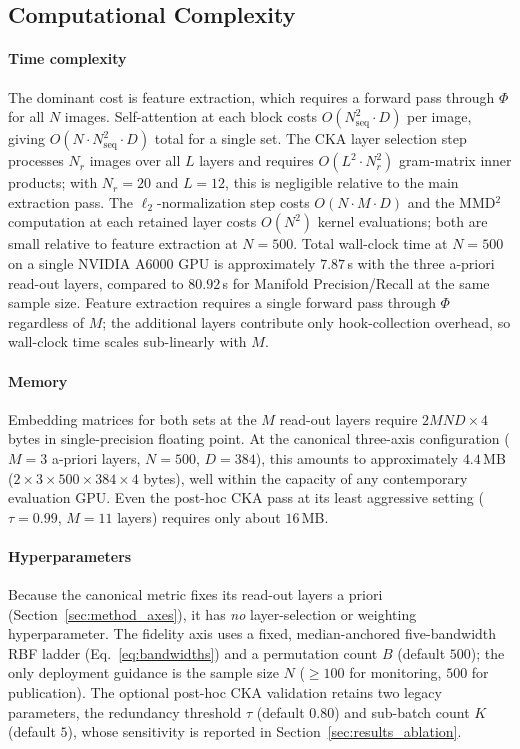 \documentclass[lettersize,journal]{IEEEtran}
\begin{document}
\subsection{Computational Complexity}
\label{sec:method_complexity}

\paragraph{Time complexity}
The dominant cost is feature extraction, which requires a forward pass
through $\Phi$ for all $N$ images.
Self-attention at each block costs $O(N_\text{seq}^2 \cdot D)$ per image,
giving $O(N \cdot N_\text{seq}^2 \cdot D)$ total for a single set.
The CKA layer selection step processes $N_r$ images over all $L$ layers
and requires $O(L^2 \cdot N_r^2)$ gram-matrix inner products; with
$N_r = 20$ and $L = 12$, this is negligible relative to the main
extraction pass.
The $\ell_2$-normalization step costs $O(N \cdot M \cdot D)$ and the
MMD$^2$ computation at each retained layer costs $O(N^2)$ kernel
evaluations; both are small relative to feature extraction at $N = 500$.
Total wall-clock time at $N = 500$ on a single NVIDIA A6000 GPU is
approximately $7.87$\,s with the three a-priori read-out layers, compared
to $80.92$\,s for Manifold Precision/Recall at the same sample size.
Feature extraction requires a single forward pass through $\Phi$
regardless of $M$; the additional layers contribute only hook-collection
overhead, so wall-clock time scales sub-linearly with $M$.

\paragraph{Memory}
Embedding matrices for both sets at the $M$ read-out layers require
$2MND \times 4$ bytes in single-precision floating point.
At the canonical three-axis configuration ($M = 3$ a-priori layers,
$N = 500$, $D = 384$), this amounts to approximately $4.4$\,MB
($2 \times 3 \times 500 \times 384 \times 4$ bytes), well within the
capacity of any contemporary evaluation GPU. Even the post-hoc CKA pass at
its least aggressive setting ($\tau = 0.99$, $M = 11$ layers) requires only
about $16$\,MB.

\paragraph{Hyperparameters}
Because the canonical metric fixes its read-out layers a priori
(Section~\ref{sec:method_axes}), it has \emph{no} layer-selection or
weighting hyperparameter. The fidelity axis uses a fixed, median-anchored
five-bandwidth RBF ladder (Eq.~\eqref{eq:bandwidths}) and a permutation
count $B$ (default $500$); the only deployment guidance is the sample size
$N$ ($\geq 100$ for monitoring, $500$ for publication). The optional
post-hoc CKA validation retains two legacy parameters, the redundancy
threshold $\tau$ (default $0.80$) and sub-batch count $K$ (default $5$),
whose sensitivity is reported in Section~\ref{sec:results_ablation}.
\end{document}
